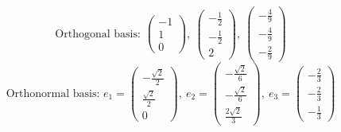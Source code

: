 \[ \text{Orthogonal basis: }\begin{pmatrix}-1 \\ 1 \\ 0\end{pmatrix},\ \begin{pmatrix}- \frac{1}{2} \\ - \frac{1}{2} \\ 2\end{pmatrix},\ \begin{pmatrix}- \frac{4}{9} \\ - \frac{4}{9} \\ - \frac{2}{9}\end{pmatrix} \]
\[ \text{Orthonormal basis: }e_1=\begin{pmatrix}- \frac{\sqrt{2}}{2} \\ \frac{\sqrt{2}}{2} \\ 0\end{pmatrix},\ e_2=\begin{pmatrix}- \frac{\sqrt{2}}{6} \\ - \frac{\sqrt{2}}{6} \\ \frac{2 \sqrt{2}}{3}\end{pmatrix},\ e_3=\begin{pmatrix}- \frac{2}{3} \\ - \frac{2}{3} \\ - \frac{1}{3}\end{pmatrix} \]

